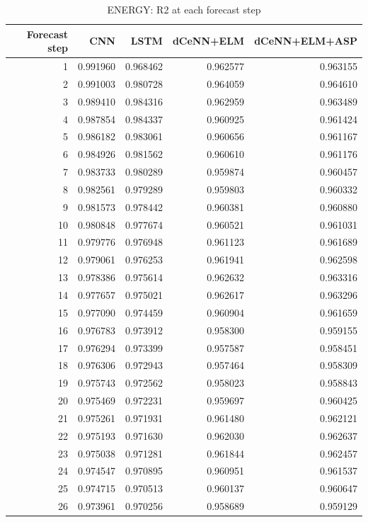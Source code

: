 \begin{table}
\caption{ENERGY: R2 at each forecast step}
\begin{tabular}{rrrrr}
\toprule
Forecast step & CNN & LSTM & dCeNN+ELM & dCeNN+ELM+ASP \\
\midrule
1 & 0.991960 & 0.968462 & 0.962577 & 0.963155 \\
2 & 0.991003 & 0.980728 & 0.964059 & 0.964610 \\
3 & 0.989410 & 0.984316 & 0.962959 & 0.963489 \\
4 & 0.987854 & 0.984337 & 0.960925 & 0.961424 \\
5 & 0.986182 & 0.983061 & 0.960656 & 0.961167 \\
6 & 0.984926 & 0.981562 & 0.960610 & 0.961176 \\
7 & 0.983733 & 0.980289 & 0.959874 & 0.960457 \\
8 & 0.982561 & 0.979289 & 0.959803 & 0.960332 \\
9 & 0.981573 & 0.978442 & 0.960381 & 0.960880 \\
10 & 0.980848 & 0.977674 & 0.960521 & 0.961031 \\
11 & 0.979776 & 0.976948 & 0.961123 & 0.961689 \\
12 & 0.979061 & 0.976253 & 0.961941 & 0.962598 \\
13 & 0.978386 & 0.975614 & 0.962632 & 0.963316 \\
14 & 0.977657 & 0.975021 & 0.962617 & 0.963296 \\
15 & 0.977090 & 0.974459 & 0.960904 & 0.961659 \\
16 & 0.976783 & 0.973912 & 0.958300 & 0.959155 \\
17 & 0.976294 & 0.973399 & 0.957587 & 0.958451 \\
18 & 0.976306 & 0.972943 & 0.957464 & 0.958309 \\
19 & 0.975743 & 0.972562 & 0.958023 & 0.958843 \\
20 & 0.975469 & 0.972231 & 0.959697 & 0.960425 \\
21 & 0.975261 & 0.971931 & 0.961480 & 0.962121 \\
22 & 0.975193 & 0.971630 & 0.962030 & 0.962637 \\
23 & 0.975038 & 0.971281 & 0.961844 & 0.962457 \\
24 & 0.974547 & 0.970895 & 0.960951 & 0.961537 \\
25 & 0.974715 & 0.970513 & 0.960137 & 0.960647 \\
26 & 0.973961 & 0.970256 & 0.958689 & 0.959129 \\

\end{tabular}
\end{table}
